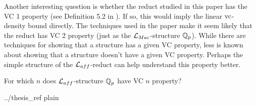 \documentclass{amsart}
\begin{document}
Another interesting question is whether the reduct studied in this paper has the VC 1 property (see Definition 5.2 in \cite{density}).
If so, this would imply the linear $\operatorname{vc}$-density bound directly.
The techniques used in the paper \cite{density} make it seem likely that the reduct has VC 2 property (just as the $\mathcal L_{Mac}$-structure $\mathbb{Q}_p$).
While there are techniques for showing that a structure has a given VC property,
less is known about showing that a structure doesn't have a given VC property.
Perhaps the simple structure of the $\mathcal L_{aff}$-reduct can help understand this property better.
\begin{openq}
  For which $n$ does $\mathcal L_{aff}$-structure $\mathbb{Q}_p$ have VC $n$ property?
\end{openq}

 {../thesis_ref}    %
 {plain}

  
\end{document}
